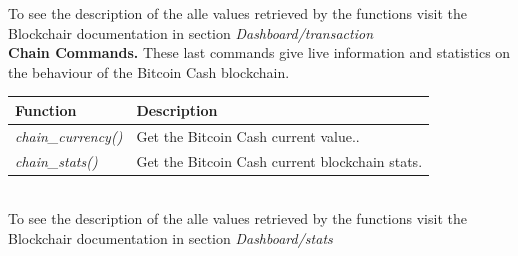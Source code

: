 To see the description of the alle values retrieved by the functions visit the Blockchair 
documentation\cite{blockchair} in section \textit{Dashboard/transaction}\medskip \\
\textbf{Chain Commands.} These last commands give live information and statistics on the behaviour of the Bitcoin Cash 
blockchain.
\begin{table}[!ht]
    \centering
    \begin{tabular}{||p{6.2cm}|p{6cm}||}
    \hline
    \textbf{Function}                          & \textbf{Description}                                                  \\ \hline
    \textit{chain\_currency()}                           & Get the Bitcoin Cash current value..                          \\ \hline
    \textit{chain\_stats()}                              & Get the Bitcoin Cash current blockchain stats.              \\ \hline
   \end{tabular}
    \end{table}\\
    To see the description of the alle values retrieved by the functions visit the Blockchair documentation\cite{blockchair} in section \textit{Dashboard/stats}\newpage


